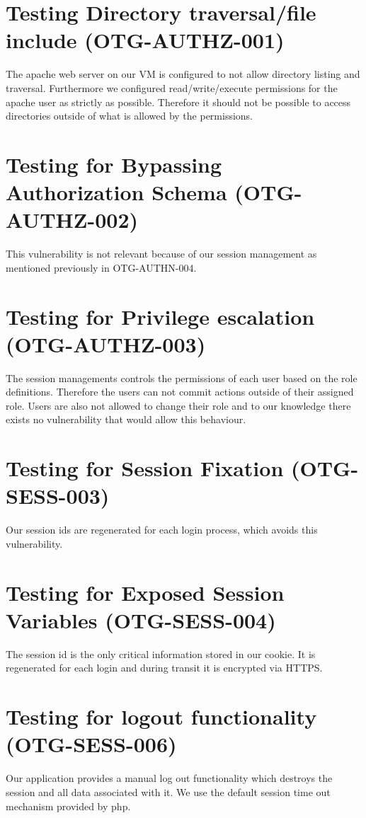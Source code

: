 \section{Testing Directory traversal/file include (OTG-AUTHZ-001)}
The apache web server on our VM is configured to not allow directory listing and traversal. Furthermore we configured read/write/execute permissions for the apache user as strictly as possible. Therefore it should not be possible to access directories outside of what is allowed by the permissions.

\section{Testing for Bypassing Authorization Schema (OTG-AUTHZ-002)}
This vulnerability is not relevant because of our session management as mentioned previously in OTG-AUTHN-004.

\section{Testing for Privilege escalation (OTG-AUTHZ-003)}
The session managements controls the permissions of each user based on the role definitions. Therefore the users can not commit actions outside of their assigned role. Users are also not allowed to change their role and to our knowledge there exists no vulnerability that would allow this behaviour. 

\section{Testing for Session Fixation (OTG-SESS-003)}
Our session ids are regenerated for each login process, which avoids this vulnerability.

\section{Testing for Exposed Session Variables (OTG-SESS-004)}
The session id is the only critical information stored in our cookie. It is regenerated for each login and during transit it is encrypted via HTTPS.

\section{Testing for logout functionality (OTG-SESS-006)}
Our application provides a manual log out functionality which destroys the session and all data associated with it. We use the default session time out mechanism provided by php.

